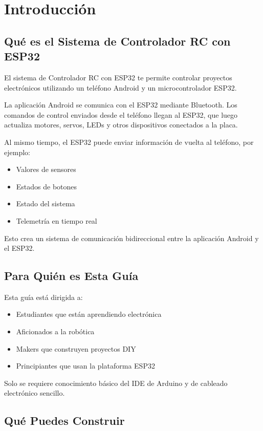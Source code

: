 \chapter{Introducción}

\section{Qué es el Sistema de Controlador RC con ESP32}

El sistema de Controlador RC con ESP32 te permite controlar proyectos electrónicos utilizando un teléfono Android y un microcontrolador ESP32.

La aplicación Android se comunica con el ESP32 mediante Bluetooth. Los comandos de control enviados desde el teléfono llegan al ESP32, que luego actualiza motores, servos, LEDs y otros dispositivos conectados a la placa.

Al mismo tiempo, el ESP32 puede enviar información de vuelta al teléfono, por ejemplo:

\begin{itemize}
    \item Valores de sensores
    \item Estados de botones
    \item Estado del sistema
    \item Telemetría en tiempo real
\end{itemize}

Esto crea un sistema de comunicación bidireccional entre la aplicación Android y el ESP32.

\section{Para Quién es Esta Guía}

Esta guía está dirigida a:

\begin{itemize}
    \item Estudiantes que están aprendiendo electrónica
    \item Aficionados a la robótica
    \item Makers que construyen proyectos DIY
    \item Principiantes que usan la plataforma ESP32
\end{itemize}

Solo se requiere conocimiento básico del IDE de Arduino y de cableado electrónico sencillo.

\section{Qué Puedes Construir}

